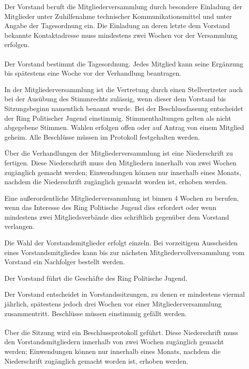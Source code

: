 \documentclass[10pt,a4paper,oneside,parskip=half]{scrartcl}
\begin{document}
\begin{contract}
Der Vorstand beruft die Mitgliederversammlung durch besondere Einladung der Mitglieder unter Zuhilfenahme technischer Kommunikationsmittel und unter Angabe der Tagesordnung ein. Die Einladung an deren letzte dem Vorstand bekannte Kontaktadresse muss mindestens zwei Wochen vor der Versammlung erfolgen.\\
\\
Der Vorstand bestimmt die Tagesordnung. Jedes Mitglied kann seine Ergänzung bis spätestens eine Woche vor der Verhandlung beantragen.

In der Mitgliederversammlung ist die Vertretung durch einen Stellvertreter auch bei der Ausübung des Stimmrechts zulässig, wenn dieser dem Vorstand bis Sitzungsbeginn namentlich benannt wurde. Bei der Beschlussfassung entscheidet der Ring Politischer Jugend einstimmig. Stimmenthaltungen gelten als nicht abgegebene Stimmen. Wahlen erfolgen offen oder auf Antrag von einem Mitglied geheim. Alle Beschlüsse müssen im Protokoll festgehalten werden.

Über die Verhandlungen der Mitgliederversammlung ist eine Niederschrift zu fertigen. Diese Niederschrift muss den Mitgliedern innerhalb von zwei Wochen zugänglich gemacht werden; Einwendungen können nur innerhalb eines Monats, nachdem die Niederschrift zugänglich gemacht worden ist, erhoben werden.

Eine außerordentliche Mitgliederversammlung ist binnen 4 Wochen zu berufen, wenn das Interesse des Ring Politische Jugend dies erfordert oder wenn mindestens zwei Mitgliedsverbände dies schriftlich gegenüber dem Vorstand verlangen.

Die Wahl der Vorstandsmitglieder erfolgt einzeln. Bei vorzeitigem Ausscheiden eines Vorstandsmitgliedes kann bis zur nächsten Mitgliedervollversammlung vom Vorstand ein Nachfolger bestellt werden.

Der Vorstand führt die Geschäfte des Ring Politische Jugend. 

Der Vorstand entscheidet in Vorstandssitzungen, zu denen er mindestens viermal jährlich, spätestens jedoch drei Wochen vor einer Mitgliederversammlung zusammentritt. Beschlüsse müssen einstimmig gefällt werden.\\
\\
Über die Sitzung wird ein Beschlussprotokoll geführt. Diese Niederschrift muss den Vorstandsmitgliedern innerhalb von zwei Wochen zugänglich gemacht werden; Einwendungen können nur innerhalb eines Monats, nachdem die Niederschrift zugänglich gemacht worden ist, erhoben werden.


\end{contract}
\end{document}

